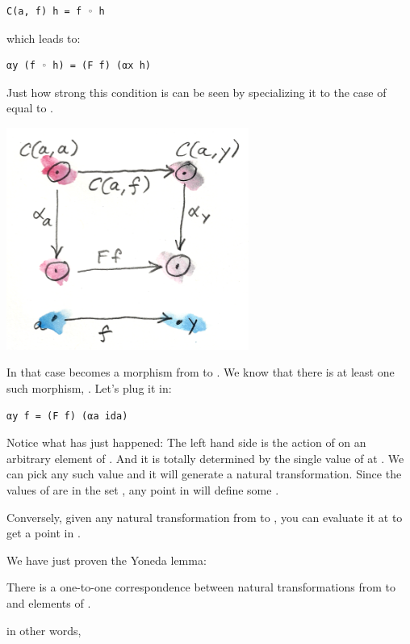 \begin{verbatim}
C(a, f) h = f ◦ h
\end{verbatim}

which leads to:

\begin{verbatim}
αy (f ◦ h) = (F f) (αx h)
\end{verbatim}

Just how strong this condition is can be seen by specializing it to the
case of  equal to .

\includegraphics[width=3.12500in]{images/yoneda2.png}

In that case  becomes a morphism from  to
. We know that there is at least one such morphism,
. Let's plug it in:

\begin{verbatim}
αy f = (F f) (αa ida)
\end{verbatim}

Notice what has just happened: The left hand side is the action of
 on an arbitrary element  of . And
it is totally determined by the single value of  at
. We can pick any such value and it will generate a natural
transformation. Since the values of  are in the set
, any point in  will define some .

Conversely, given any natural transformation  from
 to , you can evaluate it at  to
get a point in .

We have just proven the Yoneda lemma:

There is a one-to-one correspondence between natural transformations
from  to  and elements of .

in other words,

